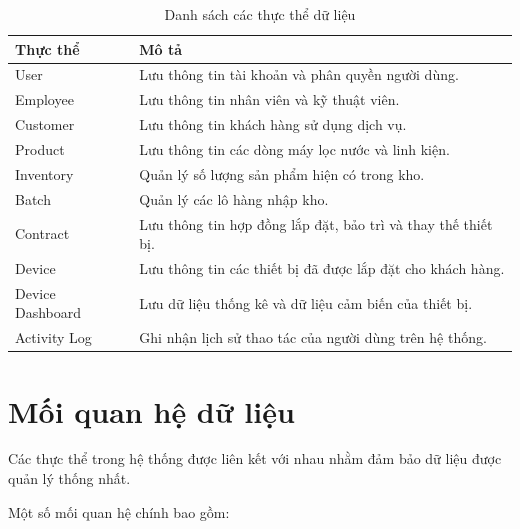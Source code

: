 \begin{table}[H]
\centering
\caption{Danh sách các thực thể dữ liệu}
\label{tab:data_entities}

\begin{tabularx}{\textwidth}{|l|X|}
\hline
\textbf{Thực thể} & \textbf{Mô tả} \\
\hline

User &
Lưu thông tin tài khoản và phân quyền người dùng. \\
\hline

Employee &
Lưu thông tin nhân viên và kỹ thuật viên. \\
\hline

Customer &
Lưu thông tin khách hàng sử dụng dịch vụ. \\
\hline

Product &
Lưu thông tin các dòng máy lọc nước và linh kiện. \\
\hline

Inventory &
Quản lý số lượng sản phẩm hiện có trong kho. \\
\hline

Batch &
Quản lý các lô hàng nhập kho. \\
\hline

Contract &
Lưu thông tin hợp đồng lắp đặt, bảo trì và thay thế thiết bị. \\
\hline

Device &
Lưu thông tin các thiết bị đã được lắp đặt cho khách hàng. \\
\hline

Device Dashboard &
Lưu dữ liệu thống kê và dữ liệu cảm biến của thiết bị. \\
\hline

Activity Log &
Ghi nhận lịch sử thao tác của người dùng trên hệ thống. \\
\hline

\end{tabularx}

\end{table}

\section{Mối quan hệ dữ liệu}

Các thực thể trong hệ thống được liên kết với nhau nhằm đảm bảo dữ liệu được quản lý thống nhất.

Một số mối quan hệ chính bao gồm:

